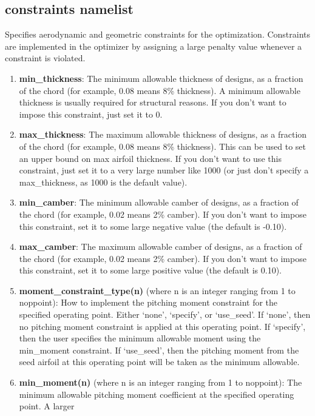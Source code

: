 \documentclass[11pt]{article}
\begin{document}
\subsection{constraints namelist}

Specifies aerodynamic and geometric constraints for the optimization.  Constraints are
implemented in the optimizer by assigning a large penalty value whenever a constraint is
violated.

\begin{enumerate}
\item{\textbf{min\_thickness}: The minimum allowable thickness of designs, as a
fraction of the chord (for example, 0.08 means 8\% thickness).  A minimum allowable
thickness is usually required for structural reasons.  If you don't want to impose this
constraint, just set it to 0.}
\item{\textbf{max\_thickness}: The maximum allowable thickness of designs, as a
fraction of the chord (for example, 0.08 means 8\% thickness). This can be used to set an
upper bound on max airfoil thickness.  If you don't want to use this constraint, just set
it to a very large number like 1000 (or just don't specify a max\_thickness, as 1000 is
the default value).}
\item{\textbf{min\_camber}: The minimum allowable camber of designs, as a fraction of the
chord (for example, 0.02 means 2\% camber). If you don't want to impose this constraint,
set it to some large negative value (the default is -0.10).}
\item{\textbf{max\_camber}: The maximum allowable camber of designs, as a fraction of the
chord (for example, 0.02 means 2\% camber). If you don't want to impose this constraint,
set it to some large positive value (the default is 0.10).}
\item{\textbf{moment\_constraint\_type(n)} (where n is an integer ranging from 1 to
noppoint): How to implement the pitching moment constraint for the specified operating
point. Either `none', `specify', or `use\_seed'.  If `none', then no pitching moment 
constraint is applied at this operating point.  If `specify', then the user specifies the 
minimum allowable moment using the min\_moment constraint.  If `use\_seed', then the 
pitching moment from the seed airfoil at this operating point will be taken as the minimum
allowable.}
\item{\textbf{min\_moment(n)} (where n is an integer ranging from 1 to noppoint): The 
minimum allowable pitching moment coefficient at the specified operating point.  A larger
}
\end{enumerate}
\end{document}
